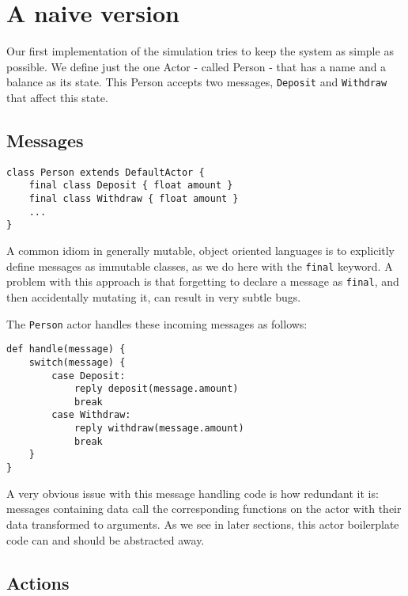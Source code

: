 \documentclass[a4paper,12pt]{kth-mag}
\begin{document}
\section{A naive version}

Our first implementation of the simulation tries to keep the system as simple as possible. We define just the one Actor - called Person - that has a name and a balance as its state. This Person accepts two messages, \texttt{Deposit} and \texttt{Withdraw} that affect this state. 

\subsection{Messages}

\begin{listing}[H]
	\begin{verbatim}
class Person extends DefaultActor {
    final class Deposit { float amount }
    final class Withdraw { float amount }
    ...
}
	\end{verbatim}
\end{listing}

A common idiom in generally mutable, object oriented languages is to explicitly define messages as immutable classes, as we do here with the \texttt{final} keyword. A problem with this approach is that forgetting to declare a message as \texttt{final}, and then accidentally mutating it, can result in very subtle bugs.

The \texttt{Person} actor handles these incoming messages as follows:

\begin{listing}[H]
	\begin{verbatim}
def handle(message) { 
    switch(message) {
        case Deposit:
            reply deposit(message.amount)
            break
        case Withdraw: 
            reply withdraw(message.amount)
            break
    }
}
	\end{verbatim}
\end{listing}

A very obvious issue with this message handling code is how redundant it is: messages containing data call the corresponding functions on the actor with their data transformed to arguments. As we see in later sections, this actor boilerplate code can and should be abstracted away.

\subsection{Actions}
\end{document}
